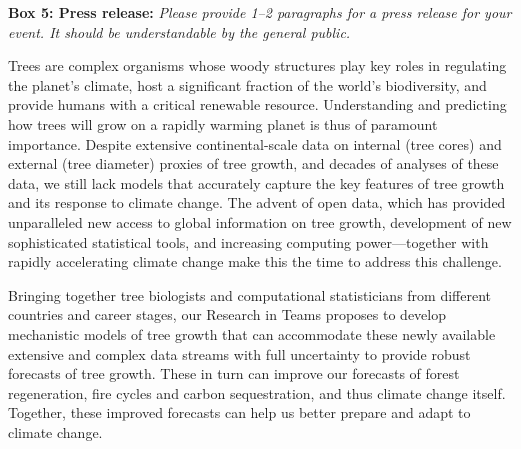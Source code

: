 \documentclass[11pt]{article}
\begin{document}
{\bf Box 5: Press release:} \emph{Please provide 1–2 paragraphs for a press release for your event. It should be understandable by the general public.}

Trees are complex organisms whose woody structures play key roles in regulating the planet's climate, host a significant fraction of the world's biodiversity, and provide humans with a critical renewable resource. Understanding and predicting how trees will grow on a rapidly warming planet is thus of paramount importance. Despite extensive continental-scale data on internal (tree cores) and external (tree diameter) proxies of tree growth, and decades of analyses of these data, we still lack models that accurately capture the key features of tree growth and its response to climate change. The advent of open data, which has provided unparalleled new access to global information on tree growth, development of new sophisticated statistical tools, and increasing computing power---together with rapidly accelerating climate change make this the time to address this challenge. 

Bringing together tree biologists and computational statisticians from different countries and career stages, our Research in Teams proposes to develop mechanistic models of tree growth that can accommodate these newly available extensive and complex data streams with full uncertainty to provide robust forecasts of tree growth. These in turn can improve our forecasts of forest regeneration, fire cycles and carbon sequestration, and thus climate change itself. Together, these improved forecasts can help us better prepare and adapt to climate change. %
\end{document}
